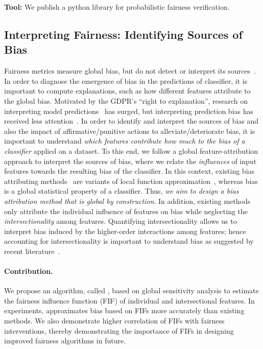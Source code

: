\textbf{Tool:} We publish a python library \href{https://github.com/meelgroup/justicia}{\justicia} for probabilistic fairness verification.



\subsection{Interpreting Fairness: Identifying Sources of Bias}
Fairness metrics measure global bias, but do not detect or interpret its sources~\cite{begley2020explainability,lundberg2020explaining,pan2021explaining}.
In order to diagnose the emergence of bias in the predictions of classifier, it is important to compute explanations, such as how different features attribute to the global bias. Motivated by the GDPR's ``right to explanation'', research on interpreting model predictions~\cite{ribeiro2016should,lundberg2017unified,lundberg2020local2global} has surged, but interpreting prediction bias has received less attention~\cite{begley2020explainability,lundberg2020explaining}. In order to identify and interpret the sources of bias and also the impact of affirmative/punitive actions to alleviate/deteriorate bias, it is important to understand \textit{which features contribute how much to the bias of a classifier} applied on a dataset. To this end, we follow a global feature-attribution approach to interpret the sources of bias, where we relate the \emph{influences} of input features towards the resulting bias of the classifier. In this context, existing bias attributing methods~\cite{begley2020explainability,lundberg2020explaining} are variants of local function approximation~\cite{sliwinski2019axiomatic}, whereas bias is a global statistical property of a classifier. Thus, \textit{we aim to design a bias attribution method that is global by construction}. In addition, existing methods only attribute the individual influence of features on bias while neglecting the \textit{intersectionality} among features. Quantifying intersectionality allows us to interpret bias induced by the higher-order interactions among features; hence accounting for intersectionality is important to understand bias as suggested by recent literature~\cite{buolamwini2018gender,wang2022towards}.  
\paragraph{Contribution.} We propose an algorithm, called {\fairXplainer}, based on global sensitivity analysis to estimate the fairness influence function (FIF) of individual and intersectional features. In experiments, {\fairXplainer} approximates bias based on FIFs more accurately than existing methods. We also demonstrate higher correlation of FIFs with fairness interventions, thereby demonstrating the importance of FIFs in designing improved fairness algorithms in future.

